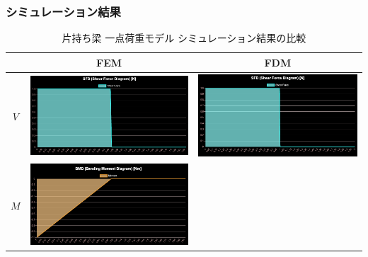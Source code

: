\documentclass{jsarticle}
\begin{document}
\subsubsection{シミュレーション結果}
\begin{table}[H]
\begin{center}
\caption{片持ち梁 一点荷重モデル シミュレーション結果の比較}
\begin{tabular}{|c|c|c|}
\hline
 & FEM & FDM \\
\hline
\hline
$V$ &
\begin{minipage}{6truecm}
\centering
\includegraphics[width=6truecm]{cantilever_one_model_FEM_sf.PNG}
\end{minipage}
&
\begin{minipage}{6truecm}
\centering
\includegraphics[width=6truecm]{cantilever_one_model_FDM_sf.PNG}
\end{minipage}
\\
\hline
$M$ &
\begin{minipage}{6truecm}
\centering
\includegraphics[width=6cm]{cantilever_one_model_FEM_bm.PNG}

\end{minipage}
\end{tabular}
\end{center}
\end{table}
\end{document}
